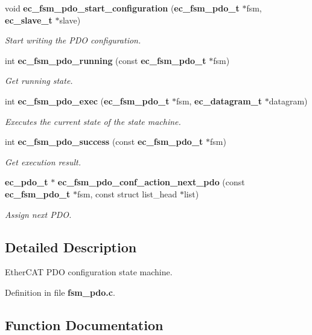 \begin{DoxyCompactItemize}
void {\bf ec\-\_\-fsm\-\_\-pdo\-\_\-start\-\_\-configuration} ({\bf ec\-\_\-fsm\-\_\-pdo\-\_\-t} $\ast$fsm, {\bf ec\-\_\-slave\-\_\-t} $\ast$slave)
\begin{DoxyCompactList}\small\item\em \-Start writing the \-P\-D\-O configuration. \end{DoxyCompactList}\item 
int {\bf ec\-\_\-fsm\-\_\-pdo\-\_\-running} (const {\bf ec\-\_\-fsm\-\_\-pdo\-\_\-t} $\ast$fsm)
\begin{DoxyCompactList}\small\item\em \-Get running state. \end{DoxyCompactList}\item 
int {\bf ec\-\_\-fsm\-\_\-pdo\-\_\-exec} ({\bf ec\-\_\-fsm\-\_\-pdo\-\_\-t} $\ast$fsm, {\bf ec\-\_\-datagram\-\_\-t} $\ast$datagram)
\begin{DoxyCompactList}\small\item\em \-Executes the current state of the state machine. \end{DoxyCompactList}\item 
int {\bf ec\-\_\-fsm\-\_\-pdo\-\_\-success} (const {\bf ec\-\_\-fsm\-\_\-pdo\-\_\-t} $\ast$fsm)
\begin{DoxyCompactList}\small\item\em \-Get execution result. \end{DoxyCompactList}\item 
{\bf ec\-\_\-pdo\-\_\-t} $\ast$ {\bf ec\-\_\-fsm\-\_\-pdo\-\_\-conf\-\_\-action\-\_\-next\-\_\-pdo} (const {\bf ec\-\_\-fsm\-\_\-pdo\-\_\-t} $\ast$fsm, const struct list\-\_\-head $\ast$list)
\begin{DoxyCompactList}\small\item\em \-Assign next \-P\-D\-O. \end{DoxyCompactList}\end{DoxyCompactItemize}


\subsection{\-Detailed \-Description}
\-Ether\-C\-A\-T \-P\-D\-O configuration state machine. 

\-Definition in file {\bf fsm\-\_\-pdo.\-c}.



\subsection{\-Function \-Documentation}
